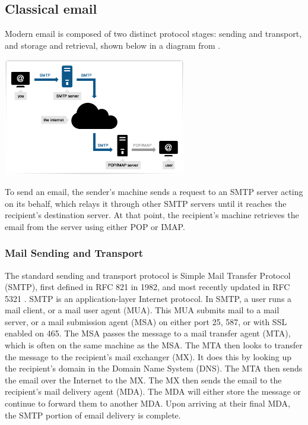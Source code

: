 \documentclass[pageno]{jpaper}
\begin{document}
\subsection{Classical email}
Modern email is composed of two distinct protocol stages: sending and transport, and storage and retrieval, shown below in a diagram from \cite{smtp_imap}.

\begin{center}
\includegraphics[width=0.6\textwidth]{smtp_imap}
\end{center}

To send an email, the sender's machine sends a request to an SMTP server acting on its behalf, which relays it through other SMTP servers until it reaches the recipient's destination server. At that point, the recipient's machine retrieves the email from the server using either POP or IMAP.

\subsubsection{Mail Sending and Transport}
The standard sending and transport protocol is Simple Mail Transfer Protocol (SMTP), first defined in RFC 821 \cite{postel1982rfc} in 1982, and most recently updated in RFC 5321 \cite{klensin2008rfc}. SMTP is an application-layer Internet protocol. In SMTP, a user runs a mail client, or a mail user agent (MUA). This MUA submits mail to a mail server, or a mail submission agent (MSA) on either port 25, 587, or with SSL enabled on 465. The MSA passes the message to a mail transfer agent (MTA), which is often on the same machine as the MSA. The MTA then looks to transfer the message to the recipient's mail exchanger (MX). It does this by looking up the recipient's domain in the Domain Name System (DNS). The MTA then sends the email over the Internet to the MX. The MX then sends the email to the recipient's mail delivery agent (MDA). The MDA will either store the message or continue to forward them to another MDA. Upon arriving at their final MDA, the SMTP portion of email delivery is complete.
\end{document}
